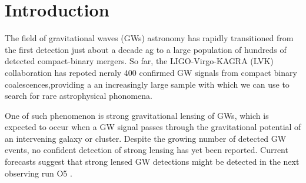 \documentclass[pdflatex,sn-mathphys-num]{sn-jnl}%
\theoremstyle{thmstyleone}%
\theoremstyle{thmstyletwo}%
\theoremstyle{thmstylethree}%
\begin{document}
\section{Introduction}
The field of gravitational waves (GWs) astronomy has rapidly transitioned from the first detection just about a decade ag to a large population of hundreds of detected compact-binary mergers. 
So far, the LIGO-Virgo-KAGRA (LVK) collaboration has repoted neraly 400 confirmed GW signals from compact binary coalescences,providing a an increasingly large sample with which we can use to search for rare astrophysical phonomena.

One of such phenomenon is strong gravitational lensing of GWs, which is expected to occur when a GW signal passes through the gravitational potential of an intervening galaxy or cluster. Despite the growing number of detected GW events, no confident detection of strong lensing has yet been reported. 
Current forecasts suggest that strong lensed GW detections might be detected in the next observing run O5 \cite{20}.
\end{document}
